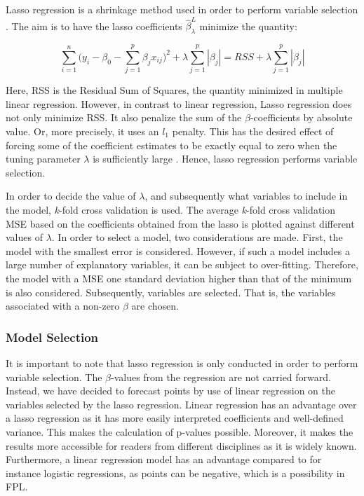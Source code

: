 Lasso regression is a shrinkage method used in order to perform variable selection \citep{ISLR}. The aim is to have the lasso coefficients $\hat{\beta}_{\lambda}^{L}$ minimize the quantity:

\begin{equation*}
    \sum_{i=1}^n\Big (y_i-\beta_0-\sum_{j=1}^p\beta_jx_{ij}\Big)^2 + \lambda \sum_{j=1}^p|\beta_j| = RSS + \lambda \sum_{j=1}^p|\beta_j|
\end{equation*}

Here, RSS is the Residual Sum of Squares, the quantity minimized in multiple linear regression. However, in contrast to linear regression, Lasso regression does not only minimize RSS. It also penalize the sum of the $\beta$-coefficients by absolute value. Or, more precisely, it uses an $l_1$ penalty. This has the desired effect of forcing some of the coefficient estimates to be exactly equal to zero when the tuning parameter $\lambda$ is sufficiently large \citep{ISLR}. Hence, lasso regression performs variable selection.\newpar 

In order to decide the value of $\lambda$, and subsequently what variables to include in the model, \textit{k}-fold cross validation is used. The average \textit{k}-fold cross validation MSE based on the coefficients obtained from the lasso is plotted against different values of $\lambda$. In order to select a model, two considerations are made. First, the model with the smallest error is considered. However, if such a model includes a large number of explanatory variables, it can be subject to over-fitting. Therefore, the model with a MSE one standard deviation higher than that of the minimum is also considered. Subsequently, variables are selected. That is, the variables associated with a non-zero $\beta$ are chosen. 

\subsubsection{Model Selection}

It is important to note that lasso regression is only conducted in order to perform variable selection. The $\beta$-values from the regression are not carried forward. Instead, we have decided to forecast points by use of linear regression on the variables selected by the lasso regression. Linear regression has an advantage over a lasso regression as it has more easily interpreted coefficients and well-defined variance. This makes the calculation of p-values possible. Moreover, it makes the results more accessible for readers from different disciplines as it is widely known. Furthermore, a linear regression model has an advantage compared to for instance logistic regressions, as points can be negative, which is a possibility in FPL.\newpar 

